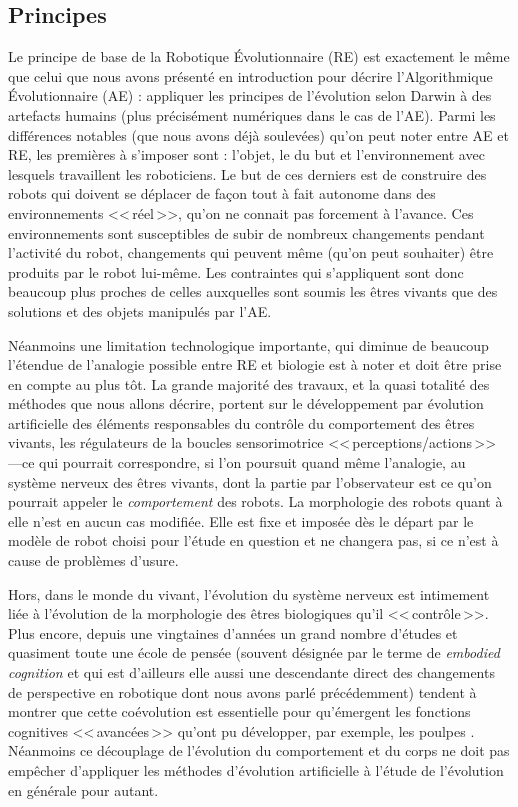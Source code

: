 \subsection{Principes}
Le principe de base de la Robotique \'Evolutionnaire (RE) est exactement le même que celui que nous avons présenté en introduction pour décrire l'Algorithmique \'Evolutionnaire (AE) : appliquer les principes de l'évolution selon Darwin à des artefacts humains (plus précisément numériques dans le cas de l'AE).
Parmi les différences notables (que nous avons déjà soulevées) qu'on peut noter entre AE et RE, les premières à s'imposer sont : l'objet, le du but et l'environnement avec lesquels travaillent les roboticiens. Le but de ces derniers est de construire des robots qui doivent se déplacer de façon tout à fait autonome dans des environnements <<\,réel\,>>, qu'on ne connait pas forcement à l'avance. Ces environnements sont susceptibles de subir de nombreux changements pendant l'activité du robot, changements qui peuvent même (qu'on peut souhaiter) être produits par le robot lui-même. Les contraintes qui s'appliquent sont donc beaucoup plus proches de celles auxquelles sont soumis les êtres vivants que des solutions et des objets manipulés par l'AE. 

Néanmoins une limitation technologique importante, qui diminue de beaucoup l'étendue de l'analogie possible entre RE et biologie est à noter et doit être prise en compte au plus tôt. La grande majorité des travaux, et la quasi totalité des méthodes que nous allons décrire, portent sur le développement par évolution artificielle des éléments responsables du contrôle du comportement des êtres vivants, les régulateurs de la boucles sensorimotrice <<\,perceptions/actions\,>> ---ce qui pourrait correspondre, si l'on poursuit quand même l'analogie, au système nerveux des êtres vivants, dont la partie par l'observateur est ce qu'on pourrait appeler le \emph{comportement} des robots. La morphologie des robots quant à elle n'est en aucun cas modifiée. Elle est fixe et imposée dès le départ par le modèle de robot choisi pour l'étude en question et ne changera pas, si ce n'est à cause de problèmes d'usure.

Hors, dans le monde du vivant, l'évolution du système nerveux est intimement liée à l'évolution de la morphologie des êtres biologiques qu'il <<\,contrôle\,>>. Plus encore, depuis une vingtaines d'années un grand nombre d'études et quasiment toute une école de pensée (souvent désignée par le terme de \emph{embodied cognition} et qui est d'ailleurs elle aussi une descendante direct des changements de perspective en robotique dont nous avons parlé précédemment) tendent à montrer que cette coévolution est essentielle pour qu'émergent les fonctions cognitives <<\,avancées\,>> qu'ont pu développer, par exemple, les poulpes \citep{pfeifer2006howthebodyshapesthewaywethink}. Néanmoins ce découplage de l'évolution du comportement et du corps ne doit pas empêcher d'appliquer les méthodes d'évolution artificielle à l'étude de l'évolution en générale pour autant.

